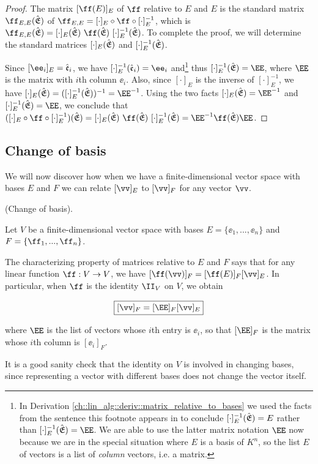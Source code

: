 \begin{proof}
   The matrix $[\ff(E)]_E$ of $\ff$ relative to $E$ and $E$ is the standard matrix $\ff_{E,E}(\sE)$ of $\ff_{E,E} = [\cdot]_E \circ \ff \circ [\cdot]_E^{-1}$, which is $\ff_{E,E}(\sE) = [\cdot]_E(\sE) \spc \ff(\sE) \spc [\cdot]_E^{-1}(\sE)$. To complete the proof, we will determine the standard matrices $[\cdot]_E({\hat{\mathfrak{E}}})$ and $[\cdot]_E^{-1}({\hat{\mathfrak{E}}})$.
   
   Since $[\ee_i]_E = \see_i$, we have $[\cdot]^{-1}_E(\see_i) = \ee_i$ and\footnote{In Derivation \ref{ch::lin_alg::deriv::matrix_relative_to_bases} we used the facts from the sentence this footnote appears in to conclude $[\cdot]_E^{-1}({\hat{\mathfrak{E}}}) = E$ rather than $[\cdot]_E^{-1}(\sE) = \EE$. We are able to use the latter matrix notation $\EE$ now because we are in the special situation where $E$ is a basis of $K^n$, so the list $E$ of vectors is a list of \textit{column} vectors, i.e. a matrix.} thus $[\cdot]_E^{-1}(\sE) = \EE$, where $\EE$ is the matrix with $i$th column $\ee_i$. Also, since $[\cdot]_E$ is the inverse of $[\cdot]_E^{-1}$, we have $[\cdot]_E(\sE) = ([\cdot]_E^{-1}(\sE))^{-1} = \EE^{-1}$. Using the two facts $[\cdot]_E(\sE) = \EE^{-1}$ and $[\cdot]_E^{-1}(\sE) = \EE$, we conclude that $([\cdot]_E \circ \ff \circ [\cdot]_E^{-1})(\sE) = [\cdot]_E(\sE) \spc  \ff(\sE) \spc [\cdot]_E^{-1}(\sE) = \EE^{-1} \ff(\sE) \EE$.
\end{proof}

\subsection*{Change of basis}

We will now discover how when we have a finite-dimensional vector space with bases $E$ and $F$ we can relate $[\vv]_E$ to $[\vv]_F$ for any vector $\vv$.

\begin{theorem}
    \label{ch::lin_alg::thm::change_of_basis_for_vectors}
    
    (Change of basis).
    
    Let $V$ be a finite-dimensional vector space with bases $E = \{\ee_1, ..., \ee_n\}$ and $F = \{\ff_1, ..., \ff_n\}$. 
    
    The characterizing property of matrices relative to $E$ and $F$ says that for any linear function $\ff:V \rightarrow V$, we have $[\ff(\vv)]_F = [\ff(E)]_F [\vv]_E$. In particular, when $\ff$ is the identity $\II_V$ on $V$, we obtain
    
    \begin{align*}
        \boxed
        {
            [\vv]_F = [\EE]_F [\vv]_E
        }
    \end{align*}
    
    where $\EE$ is the list of vectors whose $i$th entry is $\ee_i$, so that $[\EE]_F$ is the matrix whose $i$th column is $[\ee_i]_F$.
    
    It is a good sanity check that the identity on $V$ is involved in changing bases, since representing a vector with different bases does not change the vector itself.
\end{theorem}

